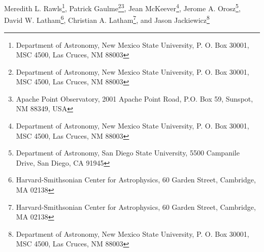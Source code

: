 Meredith L. Rawls\footnote{Department of Astronomy, New Mexico State University, P. O. Box 30001, MSC 4500, Las Cruces, NM 88003},
\setcounter{footnote}{0}
Patrick Gaulme\footnote{Department of Astronomy, New Mexico State University, P. O. Box 30001, MSC 4500, Las Cruces, NM 88003}\footnote{Apache Point Observatory, 2001 Apache Point Road, P.O. Box 59, Sunspot, NM 88349, USA},
\setcounter{footnote}{1}
Jean McKeever\footnote{Department of Astronomy, New Mexico State University, P. O. Box 30001, MSC 4500, Las Cruces, NM 88003},
Jerome A. Orosz\footnote{Department of Astronomy, San Diego State University, 5500 Campanile Drive, San Diego, CA 91945},
David W. Latham\footnote{Harvard-Smithsonian Center for Astrophysics, 60 Garden Street, Cambridge, MA 02138},
\setcounter{footnote}{3}
Christian A. Latham\footnote{Harvard-Smithsonian Center for Astrophysics, 60 Garden Street, Cambridge, MA 02138}, and 
\setcounter{footnote}{0}
Jason Jackiewicz\footnote{Department of Astronomy, New Mexico State University, P. O. Box 30001, MSC 4500, Las Cruces, NM 88003}
  
  
  
  
  
  
  
  
  